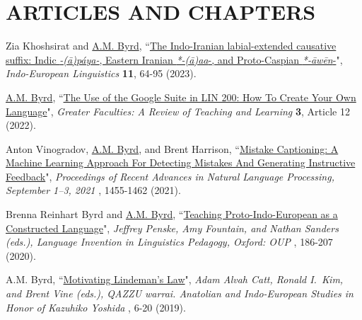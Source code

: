 \documentclass[paper=letter,fontsize=11pt,enabledeprecatedfontcommands]{scrartcl} %
\newcommand{\NewPart}[2]{\section*{\uppercase{#1} #2}}
\newcommand{\PaperEntry}[7]{
		\noindent #1, ``\href{#7}{#2}", \textit{#3} \textbf{#4}, #5 (#6).}
\begin{document}

\NewPart{Articles and Chapters}{}
\begin{etaremune}


\item \PaperEntry{Zia Khoshsirat and \underline{A.M. Byrd}}{The Indo-Iranian labial-extended causative suffix: Indic \textit{-(ā)páya-}, Eastern Iranian \textit{*-(ā)\textsubarch{u}a\textsubarch{i}a}-, and Proto-Caspian \textit{*-\={a}w\={e}n}-}{Indo-European Linguistics}{11}{64-95}{2023}{https://doi.org/10.1163/22125892-bja10025}

\item \PaperEntry{\underline{A.M. Byrd}}{The Use of the Google Suite in LIN 200: How To Create Your Own Language}{Greater Faculties: A Review of Teaching and Learning}{3}{Article 12}{2022}{https://uknowledge.uky.edu/greaterfaculties/vol3/iss1/12}

\item \PaperEntry{Anton Vinogradov, \underline{A.M. Byrd}, and Brent Harrison}{Mistake Captioning: A Machine Learning Approach For Detecting Mistakes And Generating Instructive Feedback}{Proceedings of Recent Advances in Natural Language Processing, September 1--3, 2021}{\hspace{-.35em}}{1455-1462}{2021}{https://ranlp.org/ranlp2021/proceedings-20Sep.pdf}

\item \PaperEntry{Brenna Reinhart Byrd and \underline{A.M. Byrd}}{Teaching Proto-Indo-European as a Constructed Language}{Jeffrey Penske, Amy Fountain, and Nathan Sanders (eds.), Language Invention in Linguistics Pedagogy, Oxford: OUP}{\hspace{-.35em}}{186-207}{2020}{https://oxford.universitypressscholarship.com/view/10.1093/oso/9780198829874.001.0001/oso-9780198829874-chapter-12}

\item \PaperEntry{A.M. Byrd}{Motivating Lindeman’s Law}{Adam Alvah Catt, Ronald I.~Kim, and Brent Vine (eds.), QAZZU warrai. Anatolian and Indo-European Studies in Honor of Kazuhiko Yoshida}{\hspace{-.35em}}{6-20}{2019}{http://speakingprimal.com/wp-content/uploads/2019/12/Byrd-Motivating-Lindemans-Law.pdf}


\end{etaremune}
\end{document}
